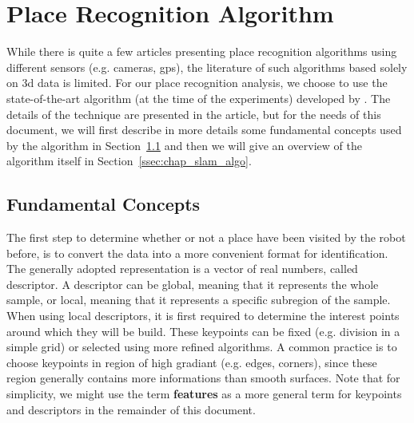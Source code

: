 \section{Place Recognition Algorithm}
\label{sec:chap_slam_algo}

While there is quite a few articles presenting place recognition algorithms using different sensors (e.g. cameras, \gls*{gps}), the literature of such algorithms based solely on \gls*{3d} data is limited. For our place recognition analysis, we choose to use the state-of-the-art algorithm (at the time of the experiments) developed by \citet{Steder2011b}. The details of the technique are presented in the article, but for the needs of this document, we will first describe in more details some fundamental concepts used by the algorithm in Section~\ref{ssec:chap_slam_basics} and then we will give an overview of the algorithm itself in Section~\ref{ssec:chap_slam_algo}. 


\subsection{Fundamental Concepts}
\label{ssec:chap_slam_basics}

The first step to determine whether or not a place have been visited by the robot before, is to convert the data into a more convenient format for identification. The generally adopted representation is a vector of real numbers, called descriptor. A descriptor can be global, meaning that it represents the whole sample, or local, meaning that it represents a specific subregion of the sample. When using local descriptors, it is first required to determine the interest points around which they will be build. These keypoints can be fixed (e.g. division in a simple grid) or selected using more refined algorithms. A common practice is to choose keypoints in region of high gradiant (e.g. edges, corners), since these region generally contains more informations than smooth surfaces. Note that for simplicity, we might use the term \textbf{features} as a more general term for keypoints and descriptors in the remainder of this document.


